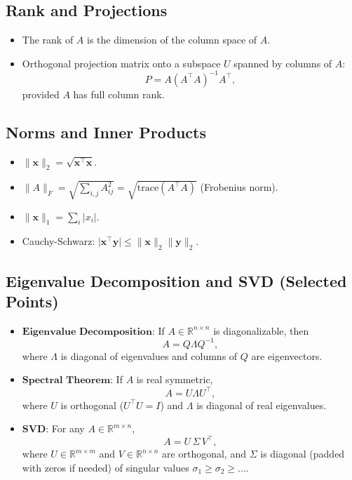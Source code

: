 \subsection*{Rank and Projections}
\begin{itemize}
  \item The rank of \(A\) is the dimension of the column space of \(A\).
  \item Orthogonal projection matrix onto a subspace \(U\) spanned by columns of \(A\):
        \[
          P = A(A^\top A)^{-1}A^\top,
        \]
        provided \(A\) has full column rank.
\end{itemize}

\subsection{Norms and Inner Products}
\begin{itemize}
  \item \(\|\mathbf{x}\|_2 = \sqrt{\mathbf{x}^\top \mathbf{x}}\).
  \item \(\|A\|_F = \sqrt{\sum_{i,j} A_{ij}^2} = \sqrt{\mathrm{trace}(A^\top A)}\) (Frobenius norm).
  \item \(\|\mathbf{x}\|_1 = \sum_{i} |x_i|\).  
  \item Cauchy-Schwarz: \(\lvert \mathbf{x}^\top \mathbf{y}\rvert \le \|\mathbf{x}\|_2 \|\mathbf{y}\|_2.\)
\end{itemize}

\subsection{Eigenvalue Decomposition and SVD (Selected Points)}
\begin{itemize}
  \item \(\textbf{Eigenvalue Decomposition}\): If \(A \in \mathbb{R}^{n \times n}\) is diagonalizable, then 
        \[
          A = Q \Lambda Q^{-1},
        \]
        where \(\Lambda\) is diagonal of eigenvalues and columns of \(Q\) are eigenvectors.
  \item \(\textbf{Spectral Theorem}\): If \(A\) is real symmetric, 
        \[
          A = U \Lambda U^\top,
        \]
        where \(U\) is orthogonal (\(U^\top U=I\)) and \(\Lambda\) is diagonal of real eigenvalues.
  \item \(\textbf{SVD}\): For any \(A \in \mathbb{R}^{m \times n}\),
        \[
          A = U\,\Sigma\,V^\top,
        \]
        where \(U \in \mathbb{R}^{m \times m}\) and \(V \in \mathbb{R}^{n \times n}\) are orthogonal, and 
        \(\Sigma\) is diagonal (padded with zeros if needed) of singular values \(\sigma_1 \ge \sigma_2 \ge \dots\).
\end{itemize}

